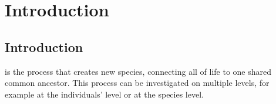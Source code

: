 \chapter{Introduction}
\label{chapter_1}

\newpage

\section{Introduction}

\noindent 
{} is the process that creates new species,
connecting all of life to one shared common ancestor. This process
can be investigated on multiple levels, for example at the individuals'
level or at the species level. 


